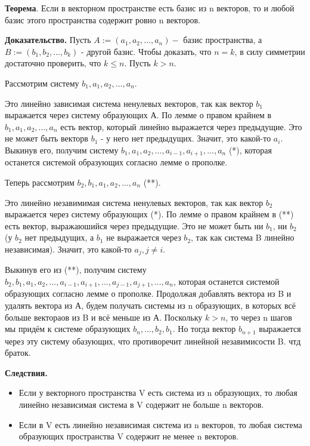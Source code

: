\documentclass[a4paper]{article}
\begin{document}
\textbf{Теорема}. Если в векторном пространстве есть базис из n векторов, то и любой базис этого пространства содержит ровно n векторов.

\textbf{Доказательство.} Пусть $A := (a_1, a_2, ..., a_n) - $ базис пространства, а $B := (b_1, b_2, ..., b_k)$ - другой базис. Чтобы доказать, что $n=k$, в силу симметрии достаточно проверить, что $k \leq n$. Пусть $k > n$.

Рассмотрим систему $b_1, a_1, a_2, ..., a_n$.

Это линейно зависимая система ненулевых векторов, так как вектор $b_1$ выражается через систему образующих А. По лемме о правом крайнем в $b_1, a_1, a_2, ..., a_n$ есть вектор, который линейно выражается через предыдущие. Это не может быть векторв $b_1$ - у него нет предыдущих. Значит, это какой-то $a_i$. Выкинув его, получим систему $b_1, a_1, a_2, ..., a_{i-1}, a_{i+1}, ..., a_n $ (*), которая останется системой образующих согласно лемме о прополке.

Теперь рассмотрим $b_2, b_1, a_1, a_2, ..., a_n$ (**).

Это линейно незавимимая система ненулевых векторов, так как вектор $b_2$ выражается через систему образующих (*). По лемме о правом крайнем в (**) есть вектор, выражаюшийся через предыдущие. Это не может быть ни $b_1$, ни $b_2$ (у $b_2$ нет предыдущих, а $b_1$ не выражается через $b_2$, так как система B линейно независимая). Значит, это какой-то $a_j, j \neq i$.

Выкинув его из (**), получим систему $b_2, b_1, a_1, a_2, ..., a_{i-1}, a_{i+1}, ..., a_{j-1}, a_{j+1}, ...,a_n$, которая останется системой образующих согласно лемме о прополке. Продолжая добавлять вектора из B и удалять вектора из А, будем получать системы из n образующих, в которых всё больше вектораов из B и всё меньше из А. Поскольку $k>n$, то через n шагов мы придём к системе образующих $b_n, ..., b_2, b_1$. Но тогда вектор $b_{n+1}$ выражается через эту систему обазующих, что противоречит линейной незавимисости B. чтд браток.


\textbf{Следствия.}
\begin{itemize}
\item Если у векторного пространства V есть система из n образующих, то любая линейно независимая система в V содержит не больше n векторов.
\item  Если в V есть линейно независимая система из n векторов, то любая система образующих пространства V содержит не менее n векторов.
\end{itemize}
\end{document}
